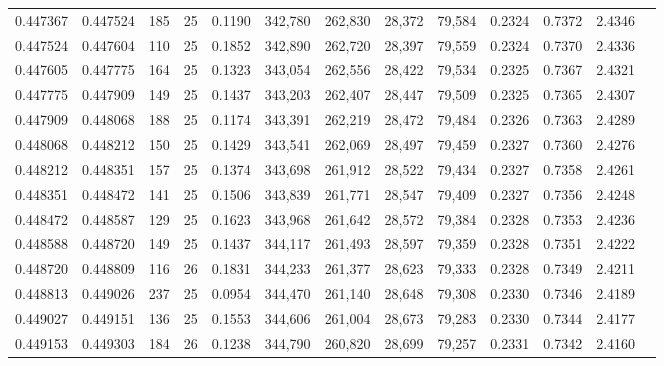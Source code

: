 \begin{tabular}{rrrrrrrrrrrrr}
0.447367 & 0.447524 &   185 &  25 &                                     0.1190 & 342,780 & 262,830 &  28,372 &  79,584 & 0.2324 & 0.7372 & 2.4346 \\
0.447524 & 0.447604 &   110 &  25 &                                     0.1852 & 342,890 & 262,720 &  28,397 &  79,559 & 0.2324 & 0.7370 & 2.4336 \\
0.447605 & 0.447775 &   164 &  25 &                                     0.1323 & 343,054 & 262,556 &  28,422 &  79,534 & 0.2325 & 0.7367 & 2.4321 \\
0.447775 & 0.447909 &   149 &  25 &                                     0.1437 & 343,203 & 262,407 &  28,447 &  79,509 & 0.2325 & 0.7365 & 2.4307 \\
0.447909 & 0.448068 &   188 &  25 &                                     0.1174 & 343,391 & 262,219 &  28,472 &  79,484 & 0.2326 & 0.7363 & 2.4289 \\
0.448068 & 0.448212 &   150 &  25 &                                     0.1429 & 343,541 & 262,069 &  28,497 &  79,459 & 0.2327 & 0.7360 & 2.4276 \\
0.448212 & 0.448351 &   157 &  25 &                                     0.1374 & 343,698 & 261,912 &  28,522 &  79,434 & 0.2327 & 0.7358 & 2.4261 \\
0.448351 & 0.448472 &   141 &  25 &                                     0.1506 & 343,839 & 261,771 &  28,547 &  79,409 & 0.2327 & 0.7356 & 2.4248 \\
0.448472 & 0.448587 &   129 &  25 &                                     0.1623 & 343,968 & 261,642 &  28,572 &  79,384 & 0.2328 & 0.7353 & 2.4236 \\
0.448588 & 0.448720 &   149 &  25 &                                     0.1437 & 344,117 & 261,493 &  28,597 &  79,359 & 0.2328 & 0.7351 & 2.4222 \\
0.448720 & 0.448809 &   116 &  26 &                                     0.1831 & 344,233 & 261,377 &  28,623 &  79,333 & 0.2328 & 0.7349 & 2.4211 \\
0.448813 & 0.449026 &   237 &  25 &                                     0.0954 & 344,470 & 261,140 &  28,648 &  79,308 & 0.2330 & 0.7346 & 2.4189 \\
0.449027 & 0.449151 &   136 &  25 &                                     0.1553 & 344,606 & 261,004 &  28,673 &  79,283 & 0.2330 & 0.7344 & 2.4177 \\
0.449153 & 0.449303 &   184 &  26 &                                     0.1238 & 344,790 & 260,820 &  28,699 &  79,257 & 0.2331 & 0.7342 & 2.4160 \\

\end{tabular}
